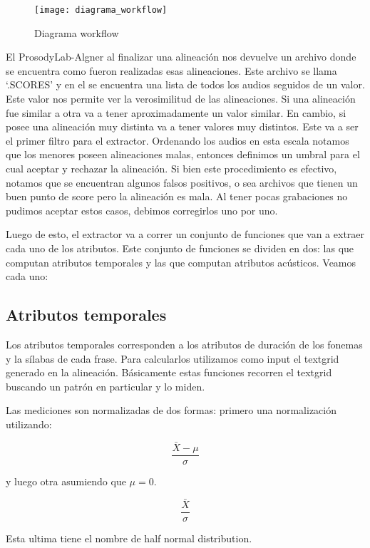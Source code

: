 \begin{figure}[h!]
    \centerline{\texttt{[image: diagrama\_workflow]} }
    \caption{Diagrama workflow}
    \label{workflow}
\end{figure}

El ProsodyLab-Algner al finalizar una alineación nos devuelve un archivo donde se encuentra como fueron realizadas esas alineaciones. Este archivo se llama `.SCORES’ y en el se encuentra una lista de todos los audios seguidos de un valor. Este valor nos permite ver la verosimilitud de las alineaciones. Si una alineación fue similar a otra va a tener aproximadamente un valor similar. En cambio, si posee una alineación muy distinta va a tener valores muy distintos. Este va a ser el primer filtro para el extractor. Ordenando los audios en esta escala notamos que los menores poseen alineaciones malas, entonces definimos un umbral para el cual aceptar y rechazar la alineación. Si bien este procedimiento es efectivo, notamos que se encuentran algunos falsos positivos, o sea archivos que tienen un buen punto de score pero la alineación es mala. Al tener pocas grabaciones no pudimos aceptar estos casos, debimos corregirlos uno por uno.

Luego de esto, el extractor va a correr un conjunto de funciones que van a extraer cada uno de los atributos. Este conjunto de funciones se dividen en dos: las que computan atributos temporales y las que computan atributos acústicos. Veamos cada uno:

\subsection{Atributos temporales}

Los atributos temporales corresponden a los atributos de duración de los fonemas y la sílabas de cada frase. Para calcularlos utilizamos como input el textgrid generado en la alineación. Básicamente estas funciones recorren el textgrid buscando un patrón en particular y lo miden.

Las mediciones son normalizadas de dos formas: primero una normalización utilizando:

\hspace{2cm} \[\frac{ \bar{X} - \mu }{ \sigma }\]

y luego otra asumiendo que $\mu = 0$. 

\hspace{2cm} \[\frac{ \bar{X} }{ \sigma }\]

Esta ultima tiene el nombre de half normal distribution.

